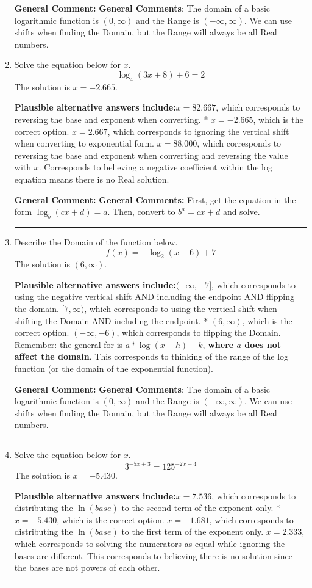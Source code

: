 \documentclass{extbook}[14pt]
\newcommand{\litem}[1]{\item #1

\rule{\textwidth}{0.4pt}}
\begin{document}
\begin{enumerate}
{\textbf{General Comment:} \textbf{General Comments}: The domain of a basic logarithmic function is $(0, \infty)$ and the Range is $(-\infty, \infty)$. We can use shifts when finding the Domain, but the Range will always be all Real numbers.
}
\litem{
Solve the equation below for $x$.
\[ \log_{4}{(3x+8)}+6 = 2 \]The solution is \( x = -2.665 \).\begin{enumerate}[label=\Alph*.]
\textbf{Plausible alternative answers include:}$x = 82.667$, which corresponds to reversing the base and exponent when converting.
* $x = -2.665$, which is the correct option.
$x = 2.667$, which corresponds to ignoring the vertical shift when converting to exponential form.
$x = 88.000$, which corresponds to reversing the base and exponent when converting and reversing the value with $x$.
Corresponds to believing a negative coefficient within the log equation means there is no Real solution.
\end{enumerate}

\textbf{General Comment:} \textbf{General Comments:} First, get the equation in the form $\log_b{(cx+d)} = a$. Then, convert to $b^a = cx+d$ and solve.
}
\litem{
Describe the Domain of the function below.
\[ f(x) = -\log_2{(x-6)}+7 \]The solution is \( (6, \infty) \).\begin{enumerate}[label=\Alph*.]
\textbf{Plausible alternative answers include:}$(-\infty, -7]$, which corresponds to using the negative vertical shift AND including the endpoint AND flipping the domain.
$[7, \infty)$, which corresponds to using the vertical shift when shifting the Domain AND including the endpoint.
* $(6, \infty)$, which is the correct option.
$(-\infty, -6)$, which corresponds to flipping the Domain. Remember: the general for is $a*\log(x-h)+k$, \textbf{where $a$ does not affect the domain}.
This corresponds to thinking of the range of the log function (or the domain of the exponential function).
\end{enumerate}

\textbf{General Comment:} \textbf{General Comments}: The domain of a basic logarithmic function is $(0, \infty)$ and the Range is $(-\infty, \infty)$. We can use shifts when finding the Domain, but the Range will always be all Real numbers.
}
\litem{
Solve the equation below for $x$.
\[ 3^{-5x+3} = 125^{-2x-4} \]The solution is \( x = -5.430 \).\begin{enumerate}[label=\Alph*.]
\textbf{Plausible alternative answers include:}$x = 7.536$, which corresponds to distributing the $\ln(base)$ to the second term of the exponent only.
* $x = -5.430$, which is the correct option.
$x = -1.681$, which corresponds to distributing the $\ln(base)$ to the first term of the exponent only.
$x = 2.333$, which corresponds to solving the numerators as equal while ignoring the bases are different.
This corresponds to believing there is no solution since the bases are not powers of each other.
\end{enumerate}

}
\end{enumerate}
\end{document}
